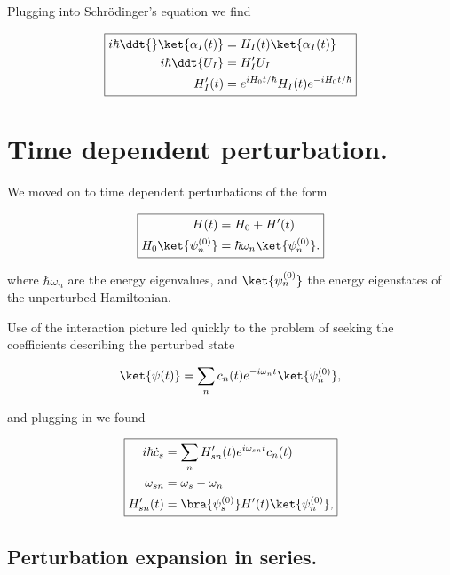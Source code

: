 Plugging into Schr\"{o}dinger's equation we find

\begin{equation}\label{eqn:qmTwoReview:410}
\boxed{
\begin{aligned}
i \hbar \ddt{} \ket{\alpha_I(t)} &= H_I(t) \ket{\alpha_I(t)} \\
i \hbar \ddt{U_I} &= H_I' U_I \\
H_I'(t) &= e^{i H_0 t/\hbar } H_I(t) e^{-i H_0 t/\hbar } 
\end{aligned}
}
\end{equation}

\section{Time dependent perturbation.}

We moved on to time dependent perturbations of the form

\begin{equation}\label{eqn:qmTwoReview:430}
\boxed{
\begin{aligned}
H(t) &= H_0 + H'(t) \\
H_0 \ket{\psi_n^{(0)} } &= \hbar \omega_n \ket{\psi_n^{(0)} }.
\end{aligned}
}
\end{equation}

where $\hbar \omega_n$ are the energy eigenvalues, and $\ket{\psi_n^{(0)} }$ the energy eigenstates of the unperturbed Hamiltonian.

Use of the interaction picture led quickly to the problem of seeking the coefficients describing the perturbed state

\begin{equation}\label{eqn:qmTwoReview:450}
\ket{\psi(t)} = \sum_n c_n(t) e^{-i \omega_n t} \ket{\psi_n^{(0)} },
\end{equation}

and plugging in we found

\begin{equation}\label{eqn:qmTwoReview:470}
\boxed{
\begin{aligned}
i \hbar \dot{c}_s &= \sum_n H_{sn}'(t) e^{i \omega_{sn} t} c_n(t) \\
\omega_{sn} &= \omega_s - \omega_n \\
H_{sn}'(t) &= \bra{\psi_s^{(0)}} H'(t) \ket{\psi_n^{(0)} },
\end{aligned}
}
\end{equation}

\subsection{Perturbation expansion in series.}

